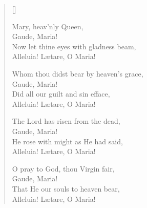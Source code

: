 
\newHymn


\begin{verse}[\versewidth]

 Mary, heav’nly Queen,\\
\vin Gaude, Maria!\\
Now let thine eyes with gladness beam,\\
Alleluia! Lætare, O Maria!

Whom thou didst bear by heaven’s grace,\\
\vin Gaude, Maria!\\
Did all our guilt and sin efface,\\
Alleluia! Lætare, O Maria!

The Lord has risen from the dead,\\
\vin Gaude, Maria!\\
He rose with might as He had said,\\
Alleluia! Lætare, O Maria!

O pray to God, thou Virgin fair,\\
\vin Gaude, Maria!\\
That He our souls to heaven bear,\\
Alleluia! Lætare, O Maria!

\end{verse}

